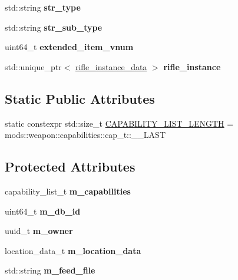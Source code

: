 \begin{DoxyCompactItemize}
\mbox{\label{structobj__data_aadb3fb95c8ca267eb13716401769456e}} 
std\+::string {\bfseries str\+\_\+type}
\item 
\mbox{\label{structobj__data_ad62dffe76d361d49b4c6475ad92e933a}} 
std\+::string {\bfseries str\+\_\+sub\+\_\+type}
\item 
\mbox{\label{structobj__data_a464bf2b096a75b2d4a5143a0ba1debb8}} 
uint64\+\_\+t {\bfseries extended\+\_\+item\+\_\+vnum}
\item 
\mbox{\label{structobj__data_a825196e15b29a665276e0449854101a2}} 
std\+::unique\+\_\+ptr$<$ \hyperlink{structrifle__instance__data}{rifle\+\_\+instance\+\_\+data} $>$ {\bfseries rifle\+\_\+instance}
\end{DoxyCompactItemize}
\subsection*{Static Public Attributes}
\begin{DoxyCompactItemize}
\item 
static constexpr std\+::size\+\_\+t \hyperlink{structobj__data_a8cefe6b9b7e5e568f4cf758e60db2ce2}{C\+A\+P\+A\+B\+I\+L\+I\+T\+Y\+\_\+\+L\+I\+S\+T\+\_\+\+L\+E\+N\+G\+TH} = mods\+::weapon\+::capabilities\+::cap\+\_\+t\+::\+\_\+\+\_\+\+L\+A\+ST
\end{DoxyCompactItemize}
\subsection*{Protected Attributes}
\begin{DoxyCompactItemize}
\item 
\mbox{\label{structobj__data_a95155d445f14001970bb4ce7e60869af}} 
capability\+\_\+list\+\_\+t {\bfseries m\+\_\+capabilities}
\item 
\mbox{\label{structobj__data_a7634842111e8347a45b32e3b50c15b69}} 
uint64\+\_\+t {\bfseries m\+\_\+db\+\_\+id}
\item 
\mbox{\label{structobj__data_ae5a50ebf9852ccb48b962c2718b9279f}} 
uuid\+\_\+t {\bfseries m\+\_\+owner}
\item 
\mbox{\label{structobj__data_af0a28c8761b3a97489e120c29d650590}} 
location\+\_\+data\+\_\+t {\bfseries m\+\_\+location\+\_\+data}
\item 
\mbox{\label{structobj__data_a2e71f438fe78fceae35df4b51b132b49}} 
std\+::string {\bfseries m\+\_\+feed\+\_\+file}
\end{DoxyCompactItemize}



